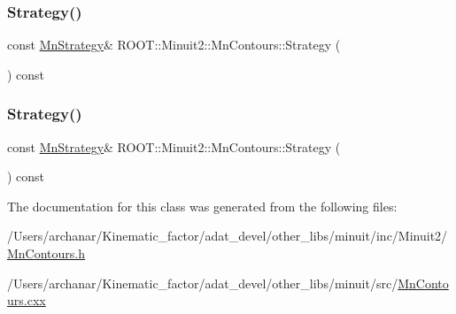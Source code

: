 \subsubsection{\texorpdfstring{Strategy()}{Strategy()}\hspace{0.1cm}{\footnotesize\ttfamily [1/2]}}
{\footnotesize\ttfamily const \mbox{\hyperlink{classROOT_1_1Minuit2_1_1MnStrategy}{Mn\+Strategy}}\& R\+O\+O\+T\+::\+Minuit2\+::\+Mn\+Contours\+::\+Strategy (\begin{DoxyParamCaption}{ }\end{DoxyParamCaption}) const\hspace{0.3cm}{\ttfamily [inline]}}

\mbox{\label{classROOT_1_1Minuit2_1_1MnContours_a79b55e1c06425b314701c4a3e5b7b009}} 
\subsubsection{\texorpdfstring{Strategy()}{Strategy()}\hspace{0.1cm}{\footnotesize\ttfamily [2/2]}}
{\footnotesize\ttfamily const \mbox{\hyperlink{classROOT_1_1Minuit2_1_1MnStrategy}{Mn\+Strategy}}\& R\+O\+O\+T\+::\+Minuit2\+::\+Mn\+Contours\+::\+Strategy (\begin{DoxyParamCaption}{ }\end{DoxyParamCaption}) const\hspace{0.3cm}{\ttfamily [inline]}}



The documentation for this class was generated from the following files\+:\begin{DoxyCompactItemize}
\item 
/\+Users/archanar/\+Kinematic\+\_\+factor/adat\+\_\+devel/other\+\_\+libs/minuit/inc/\+Minuit2/\mbox{\hyperlink{other__libs_2minuit_2inc_2Minuit2_2MnContours_8h}{Mn\+Contours.\+h}}\item 
/\+Users/archanar/\+Kinematic\+\_\+factor/adat\+\_\+devel/other\+\_\+libs/minuit/src/\mbox{\hyperlink{MnContours_8cxx}{Mn\+Contours.\+cxx}}\end{DoxyCompactItemize}
